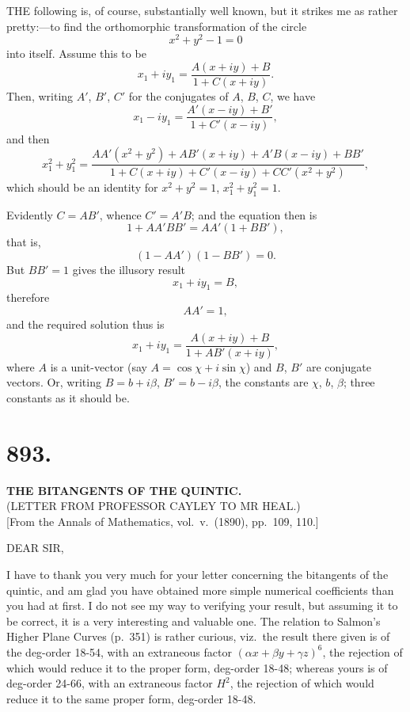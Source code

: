 \documentclass[11pt,a4paper]{book}
\begin{document}
THE following is, of course, substantially well known, but it strikes me as rather pretty:---to find the orthomorphic transformation of the circle
\[
x^2 + y^2 - 1 = 0
\]
into itself. Assume this to be
\[
x_1 + iy_1 = \frac{A(x+iy) + B}{1 + C(x+iy)}.
\]
Then, writing $A'$, $B'$, $C'$ for the conjugates of $A$, $B$, $C$, we have
\[
x_1 - iy_1 = \frac{A'(x-iy) + B'}{1 + C'(x-iy)},
\]
and then
\[
x_1^2 + y_1^2 = \frac{AA'(x^2+y^2) + AB'(x+iy) + A'B(x-iy) + BB'}{1 + C(x+iy) + C'(x-iy) + CC'(x^2+y^2)},
\]
which should be an identity for $x^2 + y^2 = 1$, $x_1^2 + y_1^2 = 1$.

Evidently $C = AB'$, whence $C' = A'B$; and the equation then is
\[
1 + AA'BB' = AA'(1 + BB'),
\]
that is,
\[
(1 - AA')(1 - BB') = 0.
\]
But $BB' = 1$ gives the illusory result
\[
x_1 + iy_1 = B,
\]
therefore
\[
AA' = 1,
\]
and the required solution thus is
\[
x_1 + iy_1 = \frac{A(x+iy) + B}{1 + AB'(x+iy)},
\]
where $A$ is a unit-vector (say $A = \cos\chi + i\sin\chi$) and $B$, $B'$ are conjugate vectors. Or, writing $B = b + i\beta$, $B' = b - i\beta$, the constants are $\chi$, $b$, $\beta$; three constants as it should be.


\section*{893.}
\begin{center}
{\large\bfseries THE BITANGENTS OF THE QUINTIC.}\\[0.3em]
{\small (LETTER FROM PROFESSOR CAYLEY TO MR HEAL.)}\\[0.3em]
\small [From the Annals of Mathematics, vol.\ v.\ (1890), pp.\ 109, 110.]
\end{center}

DEAR SIR,

I have to thank you very much for your letter concerning the bitangents of the quintic, and am glad you have obtained more simple numerical coefficients than you had at first. I do not see my way to verifying your result, but assuming it to be correct, it is a very interesting and valuable one. The relation to Salmon's Higher Plane Curves (p.\ 351) is rather curious, viz.\ the result there given is of the deg-order 18-54, with an extraneous factor $(\alpha x + \beta y + \gamma z)^6$, the rejection of which would reduce it to the proper form, deg-order 18-48; whereas yours is of deg-order 24-66, with an extraneous factor $H^2$, the rejection of which would reduce it to the same proper form, deg-order 18-48.
\end{document}
